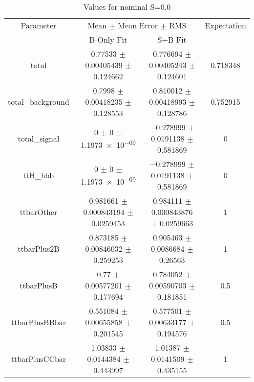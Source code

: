\begin{table}
\centering
\caption{Values for nominal S=0.0}
\begin{tabular}{cccc}
\toprule
Parameter & \multicolumn{2}{c}{Mean $\pm$ Mean Error $\pm$ RMS} & Expectation\\
 & B-Only Fit & S+B Fit & \\
\midrule
total & \num{0.77533} $\pm$ \num{0.00405439} $\pm$ \num{0.124662} & \num{0.776694} $\pm$ \num{0.00405243} $\pm$ \num{0.124601} & \num{0.718348}\\
total\_background & \num{0.7998} $\pm$ \num{0.00418235} $\pm$ \num{0.128553} & \num{0.810012} $\pm$ \num{0.00418993} $\pm$ \num{0.128786} & \num{0.752915}\\
total\_signal & \num{0} $\pm$ \num{0} $\pm$ \num{1.1973e-09} & \num{-0.278999} $\pm$ \num{0.0191138} $\pm$ \num{0.581869} & \num{0}\\
ttH\_hbb & \num{0} $\pm$ \num{0} $\pm$ \num{1.1973e-09} & \num{-0.278999} $\pm$ \num{0.0191138} $\pm$ \num{0.581869} & \num{0}\\
ttbarOther & \num{0.981661} $\pm$ \num{0.000843194} $\pm$ \num{0.0259453} & \num{0.984111} $\pm$ \num{0.000843876} $\pm$ \num{0.0259663} & \num{1}\\
ttbarPlus2B & \num{0.873185} $\pm$ \num{0.00846032} $\pm$ \num{0.259253} & \num{0.905463} $\pm$ \num{0.0086684} $\pm$ \num{0.26563} & \num{1}\\
ttbarPlusB & \num{0.77} $\pm$ \num{0.00577201} $\pm$ \num{0.177694} & \num{0.784052} $\pm$ \num{0.00590703} $\pm$ \num{0.181851} & \num{0.5}\\
ttbarPlusBBbar & \num{0.551084} $\pm$ \num{0.00655858} $\pm$ \num{0.201545} & \num{0.577501} $\pm$ \num{0.00633177} $\pm$ \num{0.194576} & \num{0.5}\\
ttbarPlusCCbar & \num{1.03833} $\pm$ \num{0.0144384} $\pm$ \num{0.443997} & \num{1.01387} $\pm$ \num{0.0141509} $\pm$ \num{0.435155} & \num{1}\\
\bottomrule
\end{tabular}
\end{table}